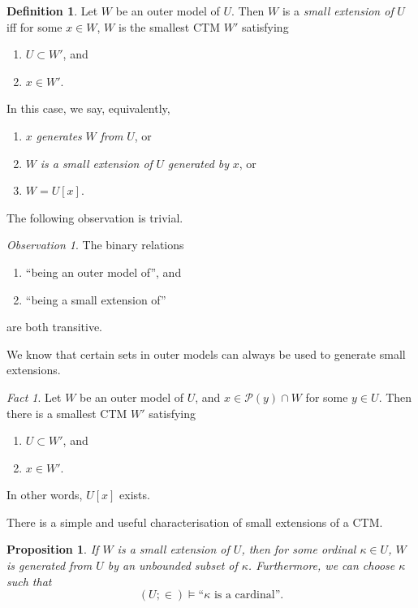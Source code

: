 \documentclass[12pt, twoside]{memoir}
\numberwithin{equation}{section}
\newtheorem{prop}[thm]{Proposition}
\theoremstyle{definition}
\newtheorem{defi}[thm]{Definition}
\theoremstyle{remark}
\newtheorem{ob}[thm]{Observation}
\newtheorem{fact}[thm]{Fact}
\theoremstyle{definition}
\theoremstyle{definition}
\theoremstyle{definition}
\theoremstyle{remark}
\begin{document}
\begin{defi}\label{def913}
Let $W$ be an outer model of $U$. Then $W$ is a \emph{small extension of} $U$ iff for some $x \in W$, $W$ is the smallest CTM $W'$ satisfying
\begin{enumerate}[label=(\alph*)]
    \item $U \subset W'$, and
    \item $x \in W'$.
\end{enumerate}
In this case, we say, equivalently,
\begin{enumerate}[label=(\arabic*)]
    \item $x$ \emph{generates} $W$ \emph{from} $U$, or
    \item $W$ \emph{is a small extension of} $U$ \emph{generated by} $x$, or
    \item $W = U[x]$.
\end{enumerate}
\end{defi}

The following observation is trivial.

\begin{ob}
The binary relations 
\begin{enumerate}[label=(\arabic*)]
    \item ``being an outer model of'', and
    \item ``being a small extension of''
\end{enumerate}
are both transitive.
\end{ob}

We know that certain sets in outer models can always be used to generate small extensions.

\begin{fact}\label{fact34}
Let $W$ be an outer model of $U$, and $x \in \mathcal{P}(y) \cap W$ for some $y \in U$. Then there is a smallest CTM $W'$ satisfying
\begin{enumerate}[label=(\alph*)]
    \item $U \subset W'$, and
    \item $x \in W'$.
\end{enumerate}
In other words, $U[x]$ exists.
\end{fact}

There is a simple and useful characterisation of small extensions of a CTM.

\begin{prop}\label{prop35}
If $W$ is a small extension of $U$, then for some ordinal $\kappa \in U$, $W$ is generated from $U$ by an unbounded subset of $\kappa$. Furthermore, we can choose $\kappa$ such that
\begin{equation*}
    (U; \in) \models \text{``} \kappa \text{ is a cardinal''.}
\end{equation*}
\end{prop}
\end{document}
